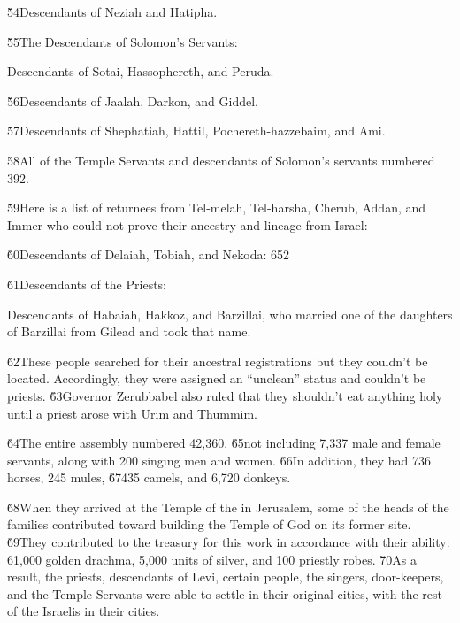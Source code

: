 \v{54}Descendants of Neziah and Hatipha.

\v{55}The Descendants of Solomon's Servants:

Descendants of Sotai, Hassophereth, and Peruda.

\v{56}Descendants of Jaalah, Darkon, and Giddel.

\v{57}Descendants of Shephatiah, Hattil, Pochereth-hazzebaim, and Ami.

\v{58}All of the Temple Servants and descendants of Solomon's servants numbered 392.

\v{59}Here is a list of returnees from Tel-melah, Tel-harsha, Cherub, Addan, and Immer who could not prove their ancestry and lineage from Israel:

\v{60}Descendants of Delaiah, Tobiah, and Nekoda: 652

\v{61}Descendants of the Priests:

Descendants of Habaiah, Hakkoz, and Barzillai, who married one of the daughters of Barzillai from Gilead and took that name.

\v{62}These people searched for their ancestral registrations but they couldn't be located. Accordingly, they were assigned an ``unclean'' status and couldn't be priests. \v{63}Governor Zerubbabel also ruled that they shouldn't eat anything holy until a priest arose with Urim and Thummim.

\v{64}The entire assembly numbered 42,360, \v{65}not including 7,337 male and female servants, along with 200 singing men and women. \v{66}In addition, they had 736 horses, 245 mules, \v{67}435 camels, and 6,720 donkeys.

\v{68}When they arrived at the Temple of the  in Jerusalem, some of the heads of the families contributed toward building the Temple of God on its former site. \v{69}They contributed to the treasury for this work in accordance with their ability: 61,000 golden drachma, 5,000 units of silver, and 100 priestly robes. \v{70}As a result, the priests, descendants of Levi, certain people, the singers, door-keepers, and the Temple Servants were able to settle in their original cities, with the rest of the Israelis in their cities.

